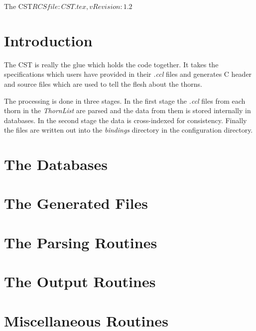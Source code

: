 %   

\begin{cactuspart}{4}{The CST}{$RCSfile: CST.tex,v $}{$Revision: 1.2 $}
\renewcommand{\thepage}{\Alph{part}\arabic{page}}

\chapter{Introduction}

The CST is really the glue which holds the code together.  It takes the 
specifications which users have provided in their {\em .ccl} files
and generates C header and source files which are used to tell the 
flesh about the thorns.

The processing is done in three stages.  In the first stage the {\em .ccl}
files from each thorn in the {\em ThornList} are parsed and the data from them
is stored internally in databases.  In the second stage the data is 
cross-indexed for consistency.  Finally the files are written out into the 
{\em bindings} directory in the configuration directory.

\chapter{The Databases}

\chapter{The Generated Files}

\chapter{The Parsing Routines}

\chapter{The Output Routines}

\chapter{Miscellaneous Routines}

\end{cactuspart}
